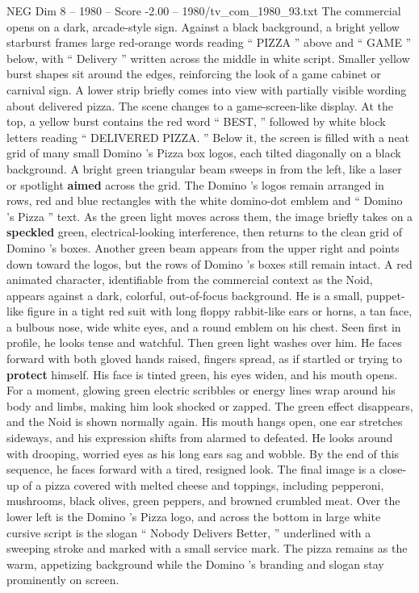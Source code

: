 \begin{textsample}{NEG Dim 8 – 1980 – Score -2.00 – 1980/tv\_com\_1980\_93.txt}  \label{ex:f8_neg_058}
The commercial opens on a dark, arcade-style sign.
Against a black background, a bright yellow starburst frames large red-orange words reading “ PIZZA ” above and “ GAME ” below, with “ Delivery ” written across the middle in white script.
Smaller yellow burst shapes sit around the edges, reinforcing the look of a game cabinet or carnival sign.
A lower strip briefly comes into view with partially visible wording about delivered pizza.
The scene changes to a game-screen-like display.
At the top, a yellow burst contains the red word “ BEST, ” followed by white block letters reading “ DELIVERED PIZZA. ” Below it, the screen is filled with a neat grid of many small Domino ’s Pizza box logos, each tilted diagonally on a black background.
A bright green triangular beam sweeps in from the left, like a laser or spotlight \textbf{aimed} across the grid.
The Domino ’s logos remain arranged in rows, red and blue rectangles with the white domino-dot emblem and “ Domino ’s Pizza ” text.
As the green light moves across them, the image briefly takes on a \textbf{speckled} green, electrical-looking interference, then returns to the clean grid of Domino ’s boxes.
Another green beam appears from the upper right and points down toward the logos, but the rows of Domino ’s boxes still remain intact.
A red animated character, identifiable from the commercial context as the Noid, appears against a dark, colorful, out-of-focus background.
He is a small, puppet-like figure in a tight red suit with long floppy rabbit-like ears or horns, a tan face, a bulbous nose, wide white eyes, and a round emblem on his chest.
Seen first in profile, he looks tense and watchful.
Then green light washes over him.
He faces forward with both gloved hands raised, fingers spread, as if startled or trying to \textbf{protect} himself.
His face is tinted green, his eyes widen, and his mouth opens.
For a moment, glowing green electric scribbles or energy lines wrap around his body and limbs, making him look shocked or zapped.
The green effect disappears, and the Noid is shown normally again.
His mouth hangs open, one ear stretches sideways, and his expression shifts from alarmed to defeated.
He looks around with drooping, worried eyes as his long ears sag and wobble.
By the end of this sequence, he faces forward with a tired, resigned look.
The final image is a close-up of a pizza covered with melted cheese and toppings, including pepperoni, mushrooms, black olives, green peppers, and browned crumbled meat.
Over the lower left is the Domino ’s Pizza logo, and across the bottom in large white cursive script is the slogan “ Nobody Delivers Better, ” underlined with a sweeping stroke and marked with a small service mark.
The pizza remains as the warm, appetizing background while the Domino ’s branding and slogan stay prominently on screen.

\end{textsample}
